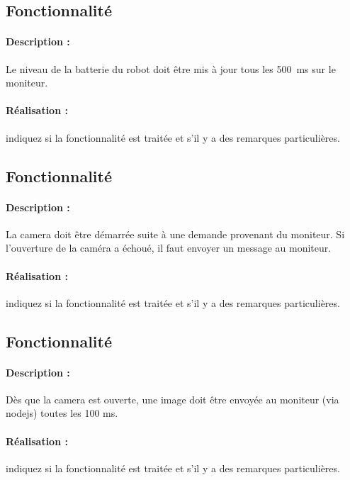\documentclass[11pt, a4paper]{paper}
\newcounter{cptreq}
\begin{document}
\subsection{Fonctionnalité \thecptreq}

\paragraph{Description :} Le niveau de la batterie du robot doit être mis à jour tous les 500~ms sur le moniteur.

\paragraph{\color{black}Réalisation :}  {\color{red} indiquez si la fonctionnalité est traitée et s'il y a des remarques particulières.}
\subsection{Fonctionnalité \thecptreq}

\paragraph{Description :} La camera doit être démarrée suite à une demande provenant du moniteur. Si l'ouverture de la  caméra a échoué, il faut envoyer un message au moniteur.

\paragraph{\color{black}Réalisation :}  {\color{red} indiquez si la fonctionnalité est traitée et s'il y a des remarques particulières.}
\subsection{Fonctionnalité \thecptreq}

\paragraph{Description :} Dès que la camera est ouverte, une image doit être envoyée au moniteur (via nodejs) toutes les 100 ms.

\paragraph{\color{black}Réalisation :}  {\color{red} indiquez si la fonctionnalité est traitée et s'il y a des remarques particulières.}
\end{document}

